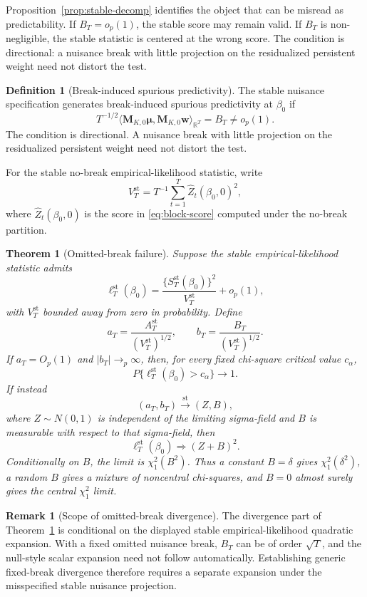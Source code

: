\documentclass[12pt]{article} %
\numberwithin{equation}{section}
\newtheorem{theorem}{Theorem}
\theoremstyle{definition}
\newtheorem{definition}{Definition}
\newtheorem{remark}{Remark}
\newcommand{\R}{\mathbb R}
\begin{document}
Proposition~\ref{prop:stable-decomp} identifies the object that can be misread as predictability. If \(B_T=o_p(1)\), the stable score may remain valid. If \(B_T\) is non-negligible, the stable statistic is centered at the wrong score. The condition is directional: a nuisance break with little projection on the residualized persistent weight need not distort the test.

\begin{definition}[Break-induced spurious predictivity]
The stable nuisance specification generates break-induced spurious predictivity at \(\beta_0\) if
\[
    T^{-1/2}
    \langle \bm M_{K,0}\bm\mu,\bm M_{K,0}\bm w\rangle_{\R^T}
    =
    B_T
    \not=o_p(1).
\]
The condition is directional. A nuisance break with little projection on the residualized persistent weight need not distort the test.
\end{definition}

For the stable no-break empirical-likelihood statistic, write
\[
    V_T^{\mathrm{st}}
    =
    T^{-1}\sum_{t=1}^T \widehat Z_t(\beta_0,0)^2,
\]
where \(\widehat Z_t(\beta_0,0)\) is the score in \eqref{eq:block-score} computed under the no-break partition.

\begin{theorem}[Omitted-break failure]
\label{thm:failure}
Suppose the stable empirical-likelihood statistic admits
\[
    \ell_T^{\mathrm{st}}(\beta_0)
    =
    \frac{\{S_T^{\mathrm{st}}(\beta_0)\}^2}{V_T^{\mathrm{st}}}
    +o_p(1),
\]
with \(V_T^{\mathrm{st}}\) bounded away from zero in probability. Define
\[
    a_T=\frac{A_T^{\mathrm{st}}}{(V_T^{\mathrm{st}})^{1/2}},
    \qquad
    b_T=\frac{B_T}{(V_T^{\mathrm{st}})^{1/2}}.
\]
If \(a_T=O_p(1)\) and \(|b_T|\to_p\infty\), then, for every fixed chi-square critical value \(c_\alpha\),
\[
    P\{\ell_T^{\mathrm{st}}(\beta_0)>c_\alpha\}\to1.
\]
If instead
\[
    (a_T,b_T)\xrightarrow{\mathrm{st}}(Z,B),
\]
where \(Z\sim N(0,1)\) is independent of the limiting sigma-field and \(B\) is measurable with respect to that sigma-field, then
\[
    \ell_T^{\mathrm{st}}(\beta_0)\Rightarrow (Z+B)^2.
\]
Conditionally on \(B\), the limit is \(\chi_1^2(B^2)\). Thus a constant \(B=\delta\) gives \(\chi_1^2(\delta^2)\), a random \(B\) gives a mixture of noncentral chi-squares, and \(B=0\) almost surely gives the central \(\chi_1^2\) limit.
\end{theorem}

\begin{remark}[Scope of omitted-break divergence]
The divergence part of Theorem~\ref{thm:failure} is conditional on the displayed stable empirical-likelihood quadratic expansion. With a fixed omitted nuisance break, \(B_T\) can be of order \(\sqrt T\), and the null-style scalar expansion need not follow automatically. Establishing generic fixed-break divergence therefore requires a separate expansion under the misspecified stable nuisance projection.
\end{remark}
\end{document}
